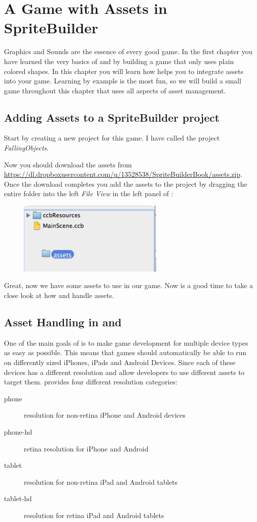 \chapter{A Game with Assets in SpriteBuilder}

Graphics and Sounds are the essence of every good game. In the first chapter you
have learned the very basics of \SB{} and \cocos{} by building a game that only
uses plain colored shapes. In this chapter you will learn how \SB{} helps you to
integrate assets into your game. Learning by example is the most fun, so we will
build a small game throughout this chapter that uses all aspects of asset
management. 

\section{Adding Assets to a SpriteBuilder project}
Start by creating a new \SB{} project for this game. I have called the
project \textit{FallingObjects}.

Now you should download the assets from
\url{https://dl.dropboxusercontent.com/u/13528538/SpriteBuilderBook/assets.zip}.
Once the download completes you add the assets to the project by dragging the
entire folder into the left \textit{File View} in the left panel of
\SB{}:

\begin{figure}[H]
		\centering
		\includegraphics[width=200pt]{images/Chapter2/DragAssets.png}
\end{figure}

Great, now we have some assets to use in our game. Now is a good time to take a
close look at how \SB{} and \cocos{} handle assets.

\section{Asset Handling in \SB{} and \cocos{}}
One of the main goals of \SB{} is to make game development for multiple device
types as easy as possible. This means that games should automatically be able to
run on differently sized iPhones, iPads and Android Devices. Since each of these
devices has a different resolution \cocos{} and \SB{} allow developers to use different assets to target them. \SB{}
provides four different resolution categories:
\begin{description}
\item[phone] resolution for non-retina iPhone and Android devices
\item[phone-hd] retina resolution for iPhone and Android
\item[tablet] resolution for non-retina iPad and Android tablets
\item[tablet-hd] resolution for retina iPad and Android tablets
\end{description}

